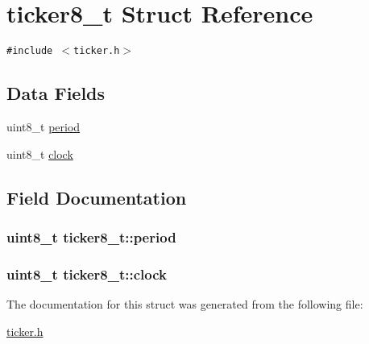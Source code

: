 \hypertarget{structticker8__t}{
\section{ticker8\_\-t Struct Reference}
\label{structticker8__t}
}
{\tt \#include $<$ticker.h$>$}

\subsection*{Data Fields}
\begin{CompactItemize}
\item 
uint8\_\-t \hyperlink{structticker8__t_f151c01fcde06421dd5c5096d676411f}{period}
\item 
uint8\_\-t \hyperlink{structticker8__t_0c9e07ccaa0e063581c5b6754b5c9495}{clock}
\end{CompactItemize}


\subsection{Field Documentation}
\hypertarget{structticker8__t_f151c01fcde06421dd5c5096d676411f}{
\subsubsection{\setlength{\rightskip}{0pt plus 5cm}uint8\_\-t {\bf ticker8\_\-t::period}}}
\label{structticker8__t_f151c01fcde06421dd5c5096d676411f}


\hypertarget{structticker8__t_0c9e07ccaa0e063581c5b6754b5c9495}{
\subsubsection{\setlength{\rightskip}{0pt plus 5cm}uint8\_\-t {\bf ticker8\_\-t::clock}}}
\label{structticker8__t_0c9e07ccaa0e063581c5b6754b5c9495}




The documentation for this struct was generated from the following file:\begin{CompactItemize}
\item 
\hyperlink{ticker_8h}{ticker.h}\end{CompactItemize}
